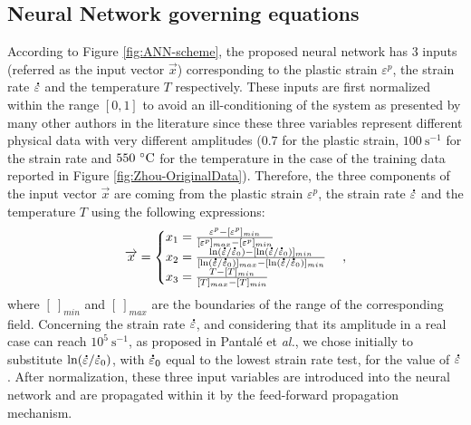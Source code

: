 \documentclass[algorithms,article,submit,pdftex,moreauthors]{Definitions/mdpi}
\makeatletter
\DeclareRobustCommand{\mdot}[1]{\accentset{\mbox{\bfseries .}}{#1}}
\DeclareRobustCommand{\eal}{et \emph{al.}\@\xspace}
\DeclareRobustCommand{\ps}{\text{s}^{-1}}
\makeatother
\begin{document}
\subsection{Neural Network governing equations}\label{sec:ANN-equations}

According to Figure \ref{fig:ANN-scheme}, the proposed neural network has $3$ inputs (referred as the input vector $\overrightarrow{x}$) corresponding to the plastic strain $\varepsilon^p$, the strain rate $\mdot\varepsilon$ and the temperature $T$ respectively.
These inputs are first normalized within the range $[0,1]$ to avoid an ill-conditioning of the system as presented by many other authors in the literature \cite{Lin-2008, Lu-2011} since these three variables represent different physical data with very different amplitudes ($0.7$ for the plastic strain, $100~\ps$ for the strain rate and $550~\celsius$ for the temperature in the case of the training data reported in Figure \ref{fig:Zhou-OriginalData}).
Therefore, the three components of the input vector $\overrightarrow{x}$ are coming from the plastic strain $\varepsilon^p$, the strain rate $\mdot\varepsilon$ and the temperature $T$ using the following expressions:
\begin{equation}
\overrightarrow{x}=
\begin{cases}
x_1 = \frac{\varepsilon^p - [\varepsilon^p]_{min}}{[\varepsilon^p]_{max} - [\varepsilon^p]_{min}}\\
x_2 = \frac{\ln(\mdot\varepsilon/\mdot\varepsilon_0)-[\ln(\mdot\varepsilon/\mdot\varepsilon_0)]_{min}}{[\ln(\mdot\varepsilon/\mdot\varepsilon_0)]_{max}-[\ln(\mdot\varepsilon/\mdot\varepsilon_0)]_{min}}\\
x_3 = \frac{T-[T]_{min}}{[T]_{max}-[T]_{min}}
\end{cases},
\label{eq:CR1}
\end{equation}
where $[~]_{min}$ and $[~]_{max}$  are the boundaries of the range of the corresponding field.
Concerning the strain rate $\mdot\varepsilon$, and considering that its amplitude in a real case can reach $10^5~\ps$, as proposed in Pantalé \eal \cite{Pantale-2021}, we chose initially to substitute $\ln(\mdot\varepsilon/\mdot\varepsilon_0)$, with $\mdot\varepsilon_0$ equal to the lowest strain rate test, for the value of $\mdot\varepsilon$.
After normalization, these three input variables are introduced into the neural network and are propagated within it by the feed-forward propagation mechanism.
\end{document}

